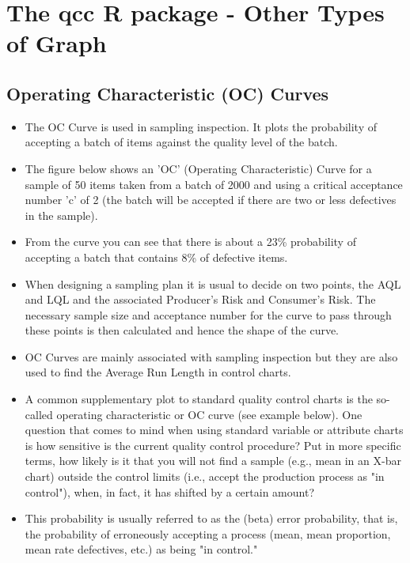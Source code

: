 \documentclass[]{report}
\begin{document}
\newpage

\section{The \textbf{qcc} R package - Other Types of Graph}




\subsection{Operating Characteristic (OC) Curves}
\begin{itemize}
\item 
The OC Curve is used in sampling inspection. It plots the probability of accepting a batch of items against the quality level of the batch.

\item The figure below shows an 'OC' (Operating Characteristic) Curve for a sample of 50 items taken from a batch of 2000 and using a critical acceptance number 'c' of 2 (the batch will be accepted if there are two or less defectives in the sample).

\item From the curve you can see that there is about a 23\% probability of accepting a batch that contains 8\% of defective items.

\item When designing a sampling plan it is usual to decide on two points, the AQL and LQL and the associated Producer's Risk and Consumer's Risk. The necessary sample size and acceptance number for the curve to pass through these points is then calculated and hence the shape of the curve.

\item OC Curves are mainly associated with sampling inspection but they are also used to find the Average Run Length in control charts.


\item A common supplementary plot to standard quality control charts is the so-called operating characteristic or OC curve (see example below). One question that comes to mind when using standard variable or attribute charts is how sensitive is the current quality control procedure? Put in more specific terms, how likely is it that you will not find a sample (e.g., mean in an X-bar chart) outside the control limits (i.e., accept the production process as "in control"), when, in fact, it has shifted by a certain amount? 

\item This probability is usually referred to as the  (beta) error probability, that is, the probability of erroneously accepting a process (mean, mean proportion, mean rate defectives, etc.) as being "in control." 


\end{itemize}
\end{document}
